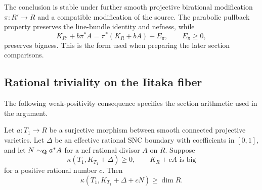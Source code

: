 \begin{remark}\label{hd:further-models}
The conclusion is stable under further smooth projective
birational modification $\pi:R'\to R$ and a compatible
modification of the source.  The parabolic pullback property
preserves the line-bundle identity and nefness, while
\[
 K_{R'}+b\pi^*A
       =\pi^*(K_R+bA)+E_\pi,\qquad E_\pi\geq0,
\]
preserves bigness.  This is the form used when preparing the
later section comparisons.
\end{remark}

\subsection{Rational triviality on the Iitaka fiber}

The following weak-positivity consequence specifies the section
arithmetic used in the argument.

\begin{lemma}
\label{ro:weak-addition}
Let $a:T_1\to R$ be a surjective morphism between smooth connected
projective varieties.  Let $\Delta$ be an effective rational SNC
boundary with coefficients in $[0,1]$, and let $N\sim_{\mathbf Q}a^*A$ for a
nef rational divisor $A$ on $R$.  Suppose
\[
 \kappa(T_1,K_{T_1}+\Delta)\ge0,
 \qquad K_R+cA\text{ is big}
\]
for a positive rational number $c$.  Then
\begin{equation}
 \kappa(T_1,K_{T_1}+\Delta+cN)\ge\dim R.
 \label{ro:weak-addition-bound}
\end{equation}
\end{lemma}

